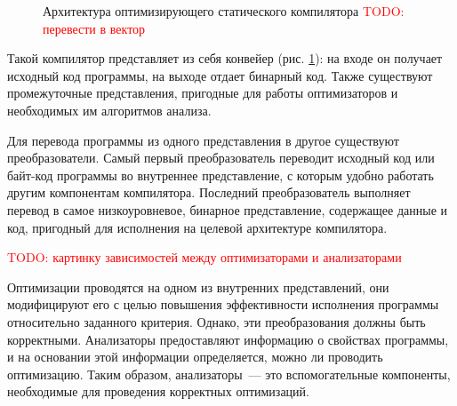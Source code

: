 \documentclass[14pt,titlepage]{extarticle}
\newcommand{\todo}[1]{\textcolor{red}{TODO: #1}}
\begin{document}
      \begin{figure}[!htb]
        \caption{Архитектура оптимизирующего статического компилятора
                 \todo{перевести в вектор}}
        \label{fig:arch}
      \end{figure}

      Такой компилятор представляет из себя конвейер (рис. \ref{fig:arch}): на
      входе он получает исходный код программы, на выходе отдает бинарный код.
      Также существуют промежуточные представления, пригодные для работы
      оптимизаторов и необходимых им алгоритмов анализа.

      Для перевода программы из одного представления в другое существуют
      преобразователи.
      Самый первый преобразователь переводит исходный код или байт-код
      программы во внутреннее представление, с которым удобно работать другим
      компонентам компилятора.
      Последний преобразователь выполняет перевод в самое низкоуровневое,
      бинарное представление, содержащее данные и код, пригодный для исполнения
      на целевой архитектуре компилятора.

      \todo{картинку зависимостей между оптимизаторами и анализаторами}

      Оптимизации проводятся на одном из внутренних представлений, они
      модифицируют его с целью повышения эффективности исполнения программы
      относительно заданного критерия. Однако, эти преобразования должны быть
      корректными. Анализаторы предоставляют информацию о свойствах программы,
      и на основании этой информации определяется, можно ли
      проводить оптимизацию. Таким образом, анализаторы~--- это вспомогательные
      компоненты, необходимые для проведения корректных оптимизаций.
\end{document}
